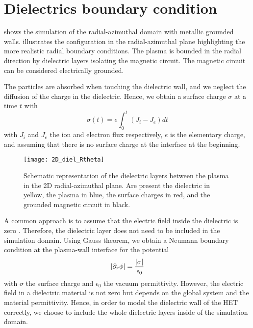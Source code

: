 
\section{Dielectrics boundary condition}
  \label{sec-diel}

   shows the simulation of the radial-azimuthal domain with metallic grounded walls.
   illustrates the configuration in the radial-azimuthal plane highlighting the more realistic radial boundary conditions.
  The plasma is bounded in the radial direction by dielectric layers isolating the magnetic circuit.
  The magnetic circuit can be considered electrically grounded.

  The particles are absorbed when touching the dielectric wall, and we neglect the diffusion of the charge in the dielectric.
  Hence, we obtain a surface charge $\sigma$ at a time $t$ with
  \begin{equation} \label{eq-sigmaintegrate}
    \sigma(t) = e \int_0^t (J_i - J_e) dt
  \end{equation}
  with $J_i$ and $J_e$ the ion and electron flux respectively, $e$ is the elementary charge, and assuming that there is no surface charge at the interface at the beginning.

  \begin{figure}[hbt]
    \centering
    \texttt{[image: 2D\_diel\_Rtheta]}
    \caption{Schematic representation of the dielectric layers between the plasma in the \acs{2D} radial-azimuthal plane. Are present the dielectric in yellow, the plasma in blue, the surface charges in red, and the grounded magnetic circuit in black.}
    \label{fig-2D}
  \end{figure}


  A common approach is to assume that the electric field inside the dielectric is zero \citep{taccogna2019}. 
  Therefore, the dielectric layer does not need to be included in the simulation domain.
  Using Gauss theorem, we obtain a Neumann boundary condition at the plasma-wall interface for the potential
  \begin{equation} \label{eq-gauss}
    \lvert\partial_r \phi\rvert = \frac{\lvert\sigma\rvert}{\epsilon_0}
  \end{equation}
  with $\sigma$ the surface charge and $\epsilon_0$ the vacuum permittivity.
  However, the electric field in a dielectric material is not zero but depends on the global system and the material permittivity.
  Hence, in order to model the dielectric wall of the \ac{HET} correctly, we choose to include the whole dielectric layers inside of the simulation domain.


